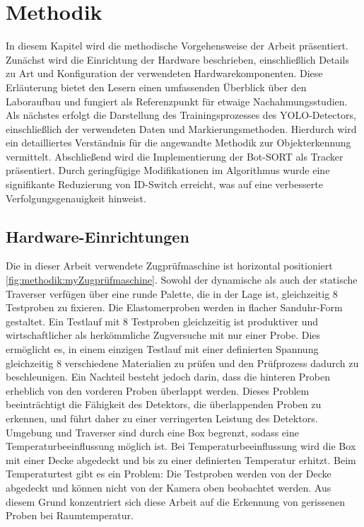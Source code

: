 \chapter{Methodik}
In diesem Kapitel wird die methodische Vorgehensweise der Arbeit präsentiert. Zunächst wird die Einrichtung der Hardware beschrieben, einschließlich Details zu Art und Konfiguration der verwendeten Hardwarekomponenten. Diese Erläuterung bietet den Lesern einen umfassenden Überblick über den Laboraufbau und fungiert als Referenzpunkt für etwaige Nachahmungsstudien. Als nächstes erfolgt die Darstellung des Trainingsprozesses des YOLO-Detectors, einschließlich der verwendeten Daten und Markierungsmethoden. Hierdurch wird ein detailliertes Verständnis für die angewandte Methodik zur Objekterkennung vermittelt. Abschließend wird die Implementierung der Bot-SORT als Tracker präsentiert. Durch geringfügige Modifikationen im Algorithmus wurde eine signifikante Reduzierung von ID-Switch erreicht, was auf eine verbesserte Verfolgungsgenauigkeit hinweist.

\section{Hardware-Einrichtungen}   
    Die in dieser Arbeit verwendete Zugprüfmaschine ist horizontal positioniert \ref{fig:methodik:myZugprüfmaschine}. Sowohl der dynamische als auch der statische Traverser verfügen über eine runde Palette, die in der Lage ist, gleichzeitig 8 Testproben zu fixieren. Die Elastomerproben werden in flacher Sanduhr-Form gestaltet. Ein Testlauf mit 8 Testproben gleichzeitig ist produktiver und wirtschaftlicher als herkömmliche Zugversuche mit nur einer Probe. Dies ermöglicht es, in einem einzigen Testlauf mit einer definierten Spannung gleichzeitig 8 verschiedene Materialien zu prüfen und den Prüfprozess dadurch zu beschleunigen. Ein Nachteil besteht jedoch darin, dass die hinteren Proben erheblich von den vorderen Proben überlappt werden. Dieses Problem beeinträchtigt die Fähigkeit des Detektors, die überlappenden Proben zu erkennen, und führt daher zu einer verringerten Leistung des Detektors. Umgebung und Traverser sind durch eine Box begrenzt, sodass eine Temperaturbeeinflussung möglich ist. Bei Temperaturbeeinflussung wird die Box mit einer Decke abgedeckt und bis zu einer definierten Temperatur erhitzt. Beim Temperaturtest gibt es ein Problem: Die Testproben werden von der Decke abgedeckt und können nicht von der Kamera oben beobachtet werden. Aus diesem Grund konzentriert sich diese Arbeit auf die Erkennung von gerissenen Proben bei Raumtemperatur.

